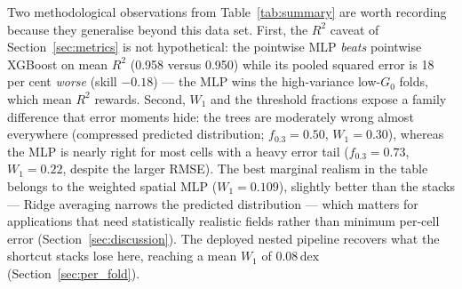 \documentclass[fleqn,usenatbib]{rasti}
\newcommand{\Gzero}{G_0}
\newcommand{\dex}{\,\text{dex}}
\newcommand{\Rsq}{R^2}
\begin{document}
Two methodological observations from Table~\ref{tab:summary} are worth
recording because they generalise beyond this data set. First, the
\(\Rsq\) caveat of Section~\ref{sec:metrics} is not hypothetical: the
pointwise MLP \emph{beats} pointwise XGBoost on mean \(\Rsq\) (0.958
versus 0.950) while its pooled squared error is 18 per cent \emph{worse}
(skill \(-0.18\)) --- the MLP wins the high-variance low-\(\Gzero\) folds,
which mean \(\Rsq\) rewards. Second, \(W_1\) and the threshold fractions
expose a family difference that error moments hide: the trees are
moderately wrong almost everywhere (compressed predicted distribution;
\(f_{0.3} = 0.50\), \(W_1 = 0.30\)), whereas the MLP is nearly right for
most cells with a heavy error tail (\(f_{0.3} = 0.73\), \(W_1 = 0.22\),
despite the larger RMSE). The best marginal realism in the table belongs
to the weighted spatial MLP (\(W_1 = 0.109\)), slightly better than the
stacks --- Ridge averaging narrows the predicted distribution --- which
matters for applications that need statistically realistic fields
rather than minimum per-cell error (Section~\ref{sec:discussion}).
The deployed nested pipeline recovers what the shortcut stacks lose
here, reaching a mean \(W_1\) of \(0.08\dex\)
(Section~\ref{sec:per_fold}).
\end{document}
